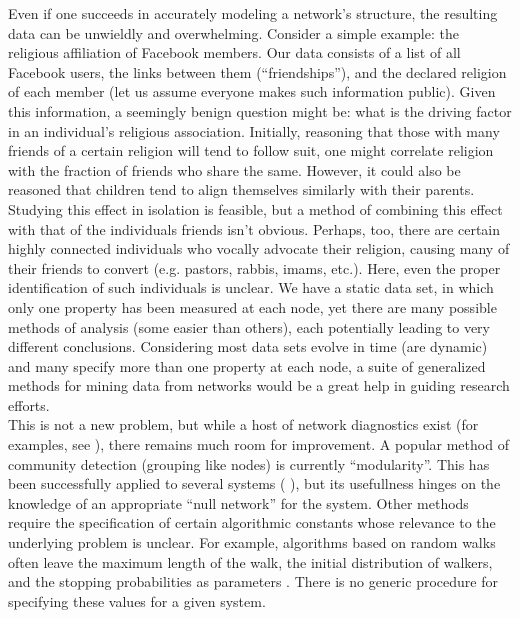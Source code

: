 \documentclass[11pt]{article}
\begin{document}
Even if one succeeds in accurately modeling a network's structure, the resulting data can be unwieldly and overwhelming. Consider a simple example: the religious affiliation of Facebook members. Our data consists of a list of all Facebook users, the links between them (``friendships''), and the declared religion of each member (let us assume everyone makes such information public). Given this information, a seemingly benign question might be: what is the driving factor in an individual's religious association. Initially, reasoning that those with many friends of a certain religion will tend to follow suit, one might correlate religion with the fraction of friends who share the same. However, it could also be reasoned that children tend to align themselves similarly with their parents. Studying this effect in isolation is feasible, but a method of combining this effect with that of the individuals friends isn't obvious. Perhaps, too, there are certain highly connected individuals who vocally advocate their religion, causing many of their friends to convert (e.g. pastors, rabbis, imams, etc.). Here, even the proper identification of such individuals is unclear. We have a static data set, in which only one property has been measured at each node, yet there are many possible methods of analysis (some easier than others), each potentially leading to very different conclusions. Considering most data sets evolve in time (are dynamic) and many specify more than one property at each node, a suite of generalized methods for mining data from networks would be a great help in guiding research efforts. \vspace{1mm}\\
This is not a new problem, but while a host of network diagnostics exist (for examples, see \cite{Fortunato2010} \cite{Newman2004} \cite{Estrada2008} \cite{Vishwanathan2008}), there remains much room for improvement. A popular method of community detection (grouping like nodes) is currently ``modularity''. This has been successfully applied to several systems (\cite{Bassett2012} \cite{Macon2012a}), but its usefullness hinges on the knowledge of an appropriate ``null network'' for the system. Other methods require the specification of certain algorithmic constants whose relevance to the underlying problem is unclear. For example, algorithms based on random walks often leave the maximum length of the walk, the initial distribution of walkers, and the stopping probabilities as parameters \cite{Kashima2003}. There is no generic procedure for specifying these values for a given system. 
\end{document}
